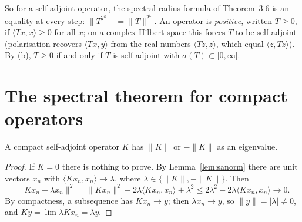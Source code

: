 So for a self-adjoint operator, the spectral radius formula of Theorem~3.6 is an equality at every step: $\|T^{2^k}\|=\|T\|^{2^k}$. An operator is \emph{positive}, written $T\ge0$, if $\langle Tx,x\rangle\ge0$ for all $x$; on a complex Hilbert space this forces $T$
to be self-adjoint (polarisation recovers $\langle Tx,y\rangle$ from the real numbers $\langle Tz,z\rangle$, which equal $\langle z,Tz\rangle$). By (b), $T\ge0$ if and only if $T$ is self-adjoint with $\sigma(T)\subset[0,\infty[$.

\section{The spectral theorem for compact operators}

\begin{lemma}\label{lem:eigenvalue}
A compact self-adjoint operator $K$ has $\|K\|$ or $-\|K\|$ as an eigenvalue.
\end{lemma}
\begin{proof}
If $K=0$ there is nothing to prove. By Lemma~\ref{lem:sanorm} there are unit vectors $x_n$ with $\langle Kx_n,x_n\rangle\to\lambda$, where $\lambda\in\{\|K\|,-\|K\|\}$. Then
\[\|Kx_n-\lambda x_n\|^2=\|Kx_n\|^2-2\lambda\langle Kx_n,x_n\rangle+\lambda^2\le2\lambda^2-2\lambda\langle Kx_n,x_n\rangle\to0.\]
By compactness, a subsequence has $Kx_n\to y$; then $\lambda x_n\to y$, so $\|y\|=|\lambda|\ne0$, and $Ky=\lim\lambda Kx_n=\lambda y$.
\end{proof}

